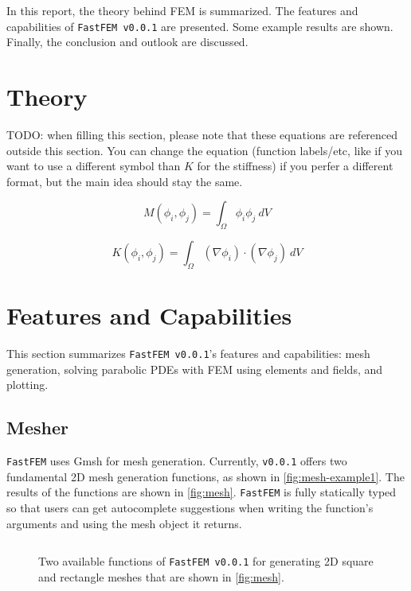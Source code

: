 \documentclass[headings=standardclasses, abstract=true]{scrartcl}
\newcommand{\pythonCodeBlock}[3]{%
    \begin{figure}
        \centering
        \begin{pythonbox}
            \inputminted[fontfamily=VSCode, fontsize=\scriptsize]{python}{#1}
        \end{pythonbox}
        \caption{#2}
        \label{#3}
    \end{figure}
}
\begin{document}
In this report, the theory behind FEM is summarized. The features and capabilities of \texttt{FastFEM v0.0.1} are presented. Some example results are shown. Finally, the conclusion and outlook are discussed.

\section{Theory}

TODO: when filling this section, please note that these equations are referenced outside this section. You can change the equation (function labels/etc, like if you want to use a different symbol than $K$ for the stiffness) if you perfer a different format, but the main idea should stay the same.



\begin{equation}
    M(\phi_i,\phi_j) = \int_{\Omega}\phi_i \phi_j~dV
    \label{eqn:mass_matrix}
\end{equation}

\begin{equation}
    K(\phi_i,\phi_j) = \int_{\Omega}(\nabla\phi_i)\cdot (\nabla\phi_j)~dV
    \label{eqn:stiffness_matrix}
\end{equation}


\section{Features and Capabilities}

This section summarizes \texttt{FastFEM v0.0.1}'s features and capabilities: mesh generation, solving parabolic PDEs with FEM using elements and fields, and plotting.

\subsection{Mesher}

\texttt{FastFEM} uses Gmsh\supercite{Gmsh} for mesh generation. Currently, \texttt{v0.0.1} offers two fundamental 2D mesh generation functions, as shown in \autoref{fig:mesh-example1}.  The results of the functions are shown in \autoref{fig:mesh}. \texttt{FastFEM} is fully statically typed so that users can get autocomplete suggestions when writing the function's arguments and using the mesh object it returns.

\pythonCodeBlock{figures/mesher-example1.py}{Two available functions of \texttt{FastFEM v0.0.1} for generating 2D square and rectangle meshes that are shown in \autoref{fig:mesh}.}{fig:mesh-example1}
\end{document}
